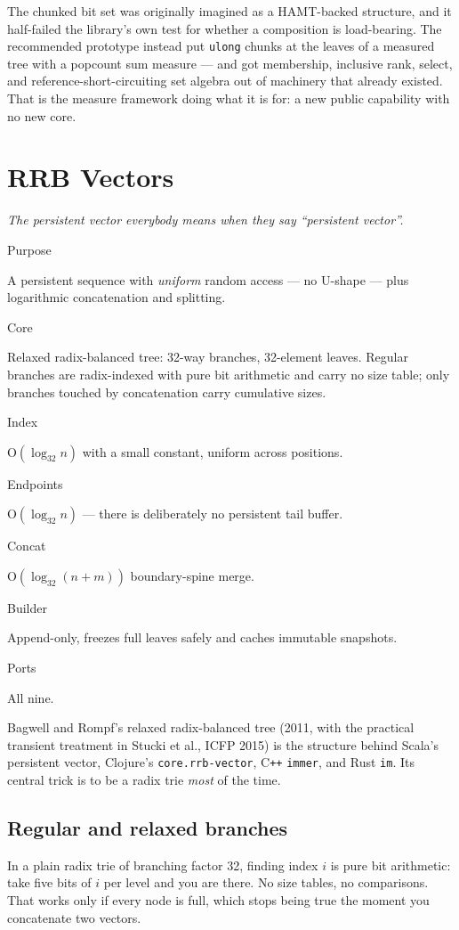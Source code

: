 \documentclass[11pt,twoside,openright]{book}
\newcommand{\code}[1]{\texorpdfstring{\textcolor{d7ink}{\texttt{#1}}}{#1}}
\newcommand{\bigoh}[1]{$\mathrm{O}(#1)$}
\newcommand{\motto}[1]{%
  \begingroup
  \vspace{-4pt}\hfill\begin{minipage}{0.80\textwidth}
    \raggedleft\itshape\color{d7slate}\small #1\par
  \end{minipage}\par\vspace{18pt}
  \endgroup}
\newcommand{\spec}[2]{%
  \par\noindent
  \parbox[t]{0.21\linewidth}{\raggedright\sffamily\bfseries\footnotesize
    \color{d7slate}\strut #1}%
  \hspace{9pt}%
  \parbox[t]{\dimexpr0.79\linewidth-9pt\relax}{\raggedright\strut #2}%
  \par\vspace{3.5pt}}
\newenvironment{specimen}[1][Specimen]
  {\begin{glancebox}[#1]\small\setlength{\parindent}{0pt}}
  {\end{glancebox}}
\begin{document}
\begin{asidebox}
The chunked bit set was originally imagined as a HAMT-backed structure, and it
half-failed the library's own test for whether a composition is load-bearing.
The recommended prototype instead put \code{ulong} chunks at the leaves of a
measured tree with a popcount sum measure --- and got membership, inclusive
rank, select, and reference-short-circuiting set algebra out of machinery that
already existed. That is the measure framework doing what it is for: a new
public capability with no new core.
\end{asidebox}

\chapter{RRB Vectors}
\label{ch:rrb}

\motto{The persistent vector everybody means when they say ``persistent
vector''.}

\begin{specimen}[Specimen --- \code{RrbVector}]
%
\spec{Purpose}{A persistent sequence with \emph{uniform} random access --- no U-shape --- plus logarithmic concatenation and splitting.}
\spec{Core}{Relaxed radix-balanced tree: 32-way branches, 32-element leaves. Regular branches are radix-indexed with pure bit arithmetic and carry no size table; only branches touched by concatenation carry cumulative sizes.}
\spec{Index}{\bigoh{\log_{32} n} with a small constant, uniform across positions.}
\spec{Endpoints}{\bigoh{\log_{32} n} --- there is deliberately no persistent tail buffer.}
\spec{Concat}{\bigoh{\log_{32}(n+m)} boundary-spine merge.}
\spec{Builder}{Append-only, freezes full leaves safely and caches immutable snapshots.}
\spec{Ports}{All nine.}
\end{specimen}

\noindent
Bagwell and Rompf's relaxed radix-balanced tree (2011, with the practical
transient treatment in Stucki et al., ICFP 2015) is the structure behind Scala's
persistent vector, Clojure's \code{core.rrb-vector}, C\texttt{++} \code{immer},
and Rust \code{im}. Its central trick is to be a radix trie \emph{most} of the
time.

\section{Regular and relaxed branches}

In a plain radix trie of branching factor 32, finding index $i$ is pure bit
arithmetic: take five bits of $i$ per level and you are there. No size tables, no
comparisons. That works only if every node is full, which stops being true the
moment you concatenate two vectors.
\end{document}
